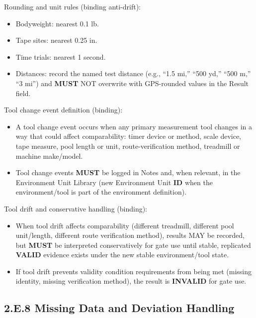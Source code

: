 \documentclass[10pt]{article}
\begin{document}
Rounding and unit rules (binding anti-drift):

\begin{itemize}
\item Bodyweight: nearest 0.1 lb.
\item Tape sites: nearest 0.25 in.
\item Time trials: nearest 1 second.
\item Distances: record the named test distance (e.g., “1.5 mi,” “500 yd,” “500 m,” “3 mi”) and \textbf{MUST} NOT overwrite with GPS-rounded values in the Result field.
\end{itemize}

Tool change event definition (binding):

\begin{itemize}
\item A tool change event occurs when any primary measurement tool changes in a way that could affect comparability: timer device or method, scale device, tape measure, pool length or unit, route-verification method, treadmill or machine make/model.
\item Tool change events \textbf{MUST} be logged in Notes and, when relevant, in the Environment Unit Library (new Environment Unit \textbf{ID} when the environment/tool is part of the environment definition).
\end{itemize}

Tool drift and conservative handling (binding):

\begin{itemize}
\item When tool drift affects comparability (different treadmill, different pool unit/length, different route verification method), results MAY be recorded, but \textbf{MUST} be interpreted conservatively for gate use until stable, replicated \textbf{VALID} evidence exists under the new stable environment/tool state.
\item If tool drift prevents validity condition requirements from being met (missing identity, missing verification method), the result is \textbf{INVALID} for gate use.
\end{itemize}

\newpage

\subsection*{2.E.8 Missing Data and Deviation Handling}
{}
\end{document}
